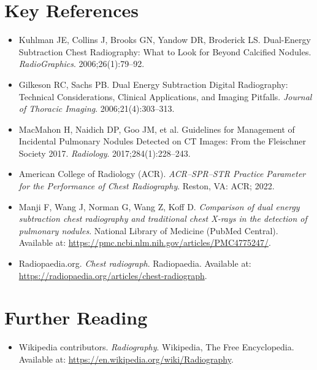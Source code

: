 \section{Key References}
\begin{itemize}
    \item Kuhlman JE, Collins J, Brooks GN, Yandow DR, Broderick LS. Dual-Energy Subtraction Chest Radiography: What to Look for Beyond Calcified Nodules. \textit{RadioGraphics}. 2006;26(1):79--92.
    \item Gilkeson RC, Sachs PB. Dual Energy Subtraction Digital Radiography: Technical Considerations, Clinical Applications, and Imaging Pitfalls. \textit{Journal of Thoracic Imaging}. 2006;21(4):303--313.
    \item MacMahon H, Naidich DP, Goo JM, et al. Guidelines for Management of Incidental Pulmonary Nodules Detected on CT Images: From the Fleischner Society 2017. \textit{Radiology}. 2017;284(1):228--243.
    \item American College of Radiology (ACR). \textit{ACR--SPR--STR Practice Parameter for the Performance of Chest Radiography}. Reston, VA: ACR; 2022.
    \item Manji F, Wang J, Norman G, Wang Z, Koff D. \textit{Comparison of dual energy subtraction chest radiography and traditional chest X-rays in the detection of pulmonary nodules}. National Library of Medicine (PubMed Central). Available at: \url{https://pmc.ncbi.nlm.nih.gov/articles/PMC4775247/}.
    \item Radiopaedia.org. \textit{Chest radiograph}. Radiopaedia. Available at: \url{https://radiopaedia.org/articles/chest-radiograph}.
\end{itemize}

\section{Further Reading}
\begin{itemize}
  \item Wikipedia contributors. \textit{Radiography}. Wikipedia, The Free Encyclopedia. Available at: \url{https://en.wikipedia.org/wiki/Radiography}.
\end{itemize}
